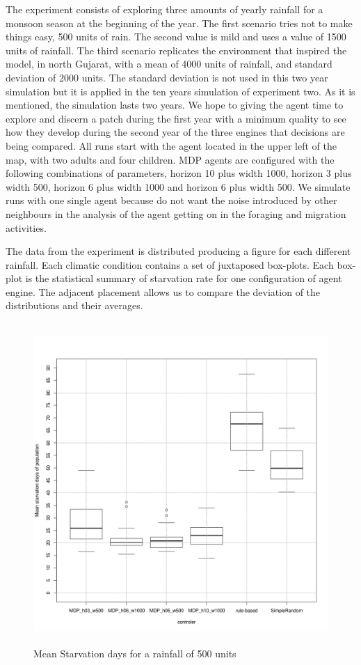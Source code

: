 \documentclass[11pt,oneside,a4paper,openright]{report}
\begin{document}
The experiment consists of exploring three amounts of yearly rainfall for a monsoon season at the beginning
of the year. The first scenario tries not to make things easy, 500 units of rain. The second value is mild
and uses a value of 1500 units of rainfall. 
The third scenario replicates the environment that inspired the model, in north Gujarat, with a mean of 4000
units of rainfall, and standard deviation of 2000 units. The standard deviation is not used in this two year
simulation but it is applied in the ten years simulation of experiment two. As it is mentioned, the simulation
lasts two years. 
We hope to giving the agent time to explore and discern a patch during the first year with a minimum quality
to see how they develop during the second year of the three engines that decisions are being compared. All 
runs start with the agent located in the upper left of the map, with two adults and four children. MDP agents
are configured with the following combinations of parameters, horizon 10 plus width 1000, horizon 3 plus 
width 500, horizon 6 plus width 1000 and horizon 6 plus width 500.
We simulate runs with one single agent because do not want the noise introduced by other neighbours in the
analysis of the agent getting on in the foraging and migration activities.

The data from the experiment is distributed producing a figure for each different rainfall.
Each climatic condition contains a set of juxtaposed box-plots. 
Each box-plot is the statistical summary of starvation rate for one configuration of agent engine. The 
adjacent placement allows us to compare the deviation of the distributions and their averages.

\begin{figure}[!htb]
\centering
\includegraphics[height=12.2cm]{figures/expm/ecsi1_clim500}
\caption{Mean Starvation days for a rainfall of 500 units}
\label{fig:ecsi1_clim500}
\end{figure}
\end{document}
